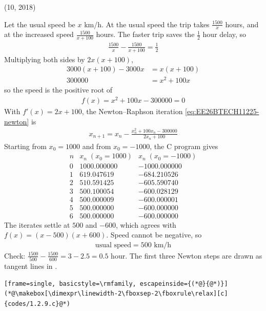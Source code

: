\begin{enumerate}[label=\thesubsection.\arabic*, ref=\thesubsection.\theenumi]
\par\hfill (10, 2018)\par
\solution
Let the usual speed be $x$ km/h. At the usual speed the trip takes $\frac{1500}{x}$ hours, and at the increased speed $\frac{1500}{x+100}$ hours. The faster trip saves the $\frac{1}{2}$ hour delay, so
\begin{align}
\frac{1500}{x} - \frac{1500}{x+100} = \frac{1}{2}
\end{align}
Multiplying both sides by $2x(x+100)$,
\begin{align*}
3000(x + 100) - 3000x &= x(x + 100) \\
300000 &= x^2 + 100x
\end{align*}
so the speed is the positive root of
\begin{align}
f(x) = x^2 + 100x - 300000 = 0
\end{align}
With $f'(x) = 2x + 100$, the Newton--Raphson iteration \eqref{eq:EE26BTECH11225-newton} is
\begin{align*}
x_{n+1} = x_n - \frac{x_n^2 + 100x_n - 300000}{2x_n + 100}
\end{align*}
Starting from $x_0 = 1000$ and from $x_0 = -1000$, the C program gives
\[
\begin{array}{c|r|r}
n & x_n\;(x_0=1000) & x_n\;(x_0=-1000)\\\hline
0 & 1000.000000 & -1000.000000 \\
1 & 619.047619 & -684.210526 \\
2 & 510.591425 & -605.590740 \\
3 & 500.100054 & -600.028129 \\
4 & 500.000009 & -600.000001 \\
5 & 500.000000 & -600.000000 \\
6 & 500.000000 & -600.000000
\end{array}
\]
The iterates settle at $500$ and $-600$, which agrees with $f(x) = (x-500)(x+600)$. Speed cannot be negative, so
\begin{align}
\boxed{\text{usual speed} = 500\text{ km/h}}
\end{align}
Check: $\frac{1500}{500} - \frac{1500}{600} = 3 - 2.5 = 0.5$ hour. The first three Newton steps are drawn as tangent lines in .
\begin{lstlisting}[frame=single, basicstyle=\rmfamily, escapeinside={(*@}{@*)}]
(*@\makebox[\dimexpr\linewidth-2\fboxsep-2\fboxrule\relax][c]{codes/1.2.9.c}@*)

\end{lstlisting}
\end{enumerate}
